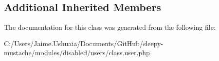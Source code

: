 \subsection*{Additional Inherited Members}


The documentation for this class was generated from the following file\-:\begin{DoxyCompactItemize}
\item 
C\-:/\-Users/\-Jaime.\-Ushuaia/\-Documents/\-Git\-Hub/sleepy-\/mustache/modules/disabled/users/class.\-user.\-php\end{DoxyCompactItemize}
